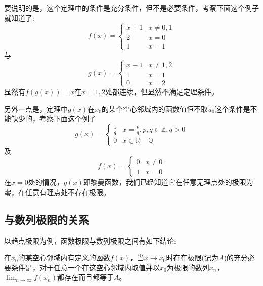 要说明的是，这个定理中的条件是充分条件，但不是必要条件，考察下面这个例子就知道了:
\[ f(x) =
  \begin{cases}
    x+1 & x \neq 0,1 \\
    2 & x=0 \\
    1 & x=1
  \end{cases}
\]
与
\[ g(x) =
  \begin{cases}
    x-1 & x \neq 1,2 \\
    1 & x=1 \\
    0 & x= 2
  \end{cases}
\]
显然有$f(g(x))=x$在$x=1,2$处都连续，但显然不满足定理条件。

另外一点是，定理中$g(x)$在$x_0$的某个空心邻域内的函数值恒不取$u_0$这个条件是不能缺少的，考察下面这个例子
\[ g(x)=
  \begin{cases}
    \frac{1}{q} & x = \frac{p}{q}, p,q \in \mathbb{Z}, q>0 \\
    0 & x \in \mathbb{R}-\mathbb{Q}
  \end{cases}
\]
及
\[ f(x) =
  \begin{cases}
    0 & x \neq 0 \\
    1 & x = 0
  \end{cases}
\]
在$x=0$处的情况，$g(x)$即黎曼函数，我们已经知道它在任意无理点处的极限为零，在任意有理点处不存在极限。

\subsection{与数列极限的关系}
\label{sec:relation-between-limit-of-function-and-number-sequence}

以趋点极限为例，函数极限与数列极限之间有如下结论:
\begin{theorem}[函数极限与数列极限的关系]
  在$x_0$的某空心邻域内有定义的函数$f(x)$，当$x \to x_0$时存在极限(记为$A$)的充分必要条件是，对于任意一个在这空心邻域内取值并以$x_0$为极限的数列$x_n$，$\lim_{n \to \infty}f(x_n)$都存在而且都等于$A$。
\end{theorem}

